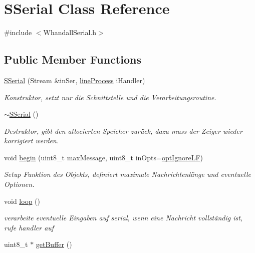 \hypertarget{class_s_serial}{}\section{S\+Serial Class Reference}
\label{class_s_serial}


{\ttfamily \#include $<$Whandall\+Serial.\+h$>$}

\subsection*{Public Member Functions}
\begin{DoxyCompactItemize}
\item 
\hyperlink{class_s_serial_a44e2b09ee4e64e82df103166d21ac516}{S\+Serial} (Stream \&in\+Ser, \hyperlink{_whandall_serial_8h_a3241d91f371dd5951b01532bce8e7be2}{line\+Process} i\+Handler)
\begin{DoxyCompactList}\small\item\em Konstruktor, setzt nur die Schnittstelle und die Verarbeitungsroutine. \end{DoxyCompactList}\item 
\hyperlink{class_s_serial_af153a485fe12aed9f49c4d9fcbd636fd}{$\sim$\+S\+Serial} ()
\begin{DoxyCompactList}\small\item\em Destruktor, gibt den allocierten Speicher zurück, dazu muss der Zeiger wieder korrigiert werden. \end{DoxyCompactList}\item 
void \hyperlink{class_s_serial_ad82361ddb96f50e930af7734086c7ed8}{begin} (uint8\+\_\+t max\+Message, uint8\+\_\+t in\+Opts=\hyperlink{_whandall_serial_8h_a06fc87d81c62e9abb8790b6e5713c55ba21464d1b8daee38b3531cf82121ce286}{opt\+Ignore\+LF})
\begin{DoxyCompactList}\small\item\em Setup Funktion des Objekts, definiert maximale Nachrichtenlänge und eventuelle Optionen. \end{DoxyCompactList}\item 
void \hyperlink{class_s_serial_a4c07d6d5d036ca05717c73836c5cc807}{loop} ()
\begin{DoxyCompactList}\small\item\em verarbeite eventuelle Eingaben auf serial, wenn eine Nachricht vollständig ist, rufe handler auf \end{DoxyCompactList}\item 
uint8\+\_\+t $\ast$ \hyperlink{class_s_serial_a51b04c6d668df7f059c05bbc20e6ce7d}{get\+Buffer} ()

\end{DoxyCompactItemize}
